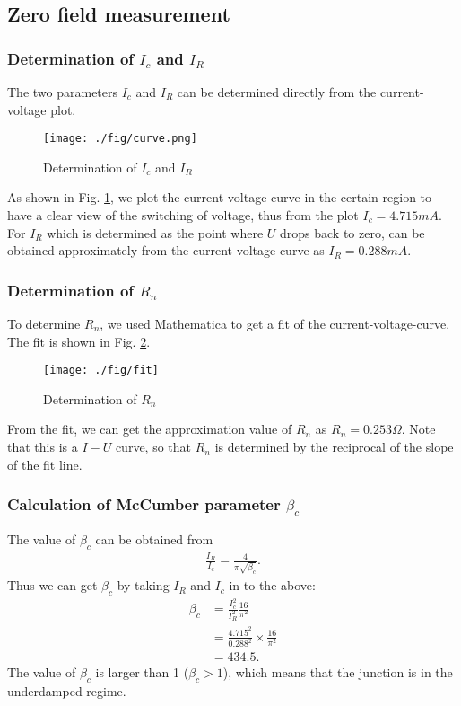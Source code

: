 \subsection{Zero field measurement}

\subsubsection{Determination of $I_{c}$ and $I_{R}$}
The two parameters $I_{c}$ and $I_{R}$ can be determined directly from the current-voltage plot.


\begin{figure}[h]
\centering
\texttt{[image: ./fig/curve.png]}
\caption{Determination of $I_{c}$ and $I_{R}$}
\label{UIcurvePicture}
\end{figure}


As shown in Fig. \ref{UIcurvePicture}, we plot the current-voltage-curve in the certain region to have a clear view of the switching of voltage,
thus from the plot $I_{c}=4.715mA$. For $I_{R}$ which is determined as the point where $U$ drops back to zero, can be obtained approximately from the current-voltage-curve as $I_R=0.288mA$.
\subsubsection{Determination of $R_{n}$}
To determine $R_{n}$, we used Mathematica to get a fit of the current-voltage-curve. The fit is shown in Fig. \ref{determinationRNfigure}.

\begin{figure}[h]
\centering
\texttt{[image: ./fig/fit]}
\caption{Determination of $R_{n}$}
\label{determinationRNfigure}
\end{figure}


From the fit, we can get the approximation value of $R_{n}$ as $R_{n}=0.253\Omega$. Note that this is a $I-U$ curve, so that $R_{n}$ is determined by the reciprocal of the slope of the fit line.

\subsubsection{Calculation of McCumber parameter $\beta_{c}$}
The value of $\beta_{c}$ can be obtained from
\begin{align*}
\frac{I_{R}}{I_{c}}=\frac{4}{\pi\sqrt{\beta_{c}}}.
\end{align*}
Thus we can get $\beta_{c}$ by taking $I_{R}$ and $I_{c}$ in to the above:
\begin{align*}
\beta_c & =\frac{I_{c}^2}{I_{R}^2}\frac{16}{\pi^2}\\
    & =\frac{4.715^2}{0.288^2}\times\frac{16}{\pi^2}\\
    & =434.5.
\end{align*}
The value of $\beta_c$ is larger than 1 ($\beta_{c}>1$), which means that the junction is in the underdamped regime.

